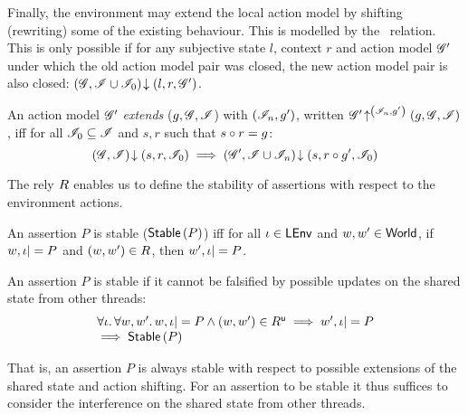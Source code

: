 Finally, the environment may extend the local action model by shifting (rewriting) some of the existing behaviour. This is modelled by the \shiftR\ relation. This is only possible if for any subjective state $l$, context $r$ and action model $\mathscr{G}'$ under which the old action model pair was closed, the new action model pair is also closed: $\left(\mathscr{G}, \mathscr{I} \cup \mathscr{I}_0\right) \!\downarrow \left(l, r, \mathscr{G}'\right)$. 
%
%
\begin{definition}\label{def:amodExtension}
An action model $\mathscr{G}'$ \emph{extends}  ($g, \mathscr{G}, \mathscr{I}$) with $(\mathscr{I}_n, g')$, written $\mathscr{G}' \!\uparrow^{\left(\mathscr{I}_n, g'\right)} \left(g, \mathscr{G}, \mathscr{I}\right)$, iff for all $\mathscr{I}_0 \subseteq \mathscr{I}$ and $s, r$ such that $s \circ r = g$:
%
\[
	\left(\mathscr{G}, \mathscr{I}\right) \!\downarrow \left(s, r, \mathscr{I}_0\right) \implies \left(\mathscr{G}', \mathscr{I} \cup \mathscr{I}_n\right) \!\downarrow \left(s, r\circ g', \mathscr{I}_0\right)
\]
%
\end{definition}
%
%
The rely $R$ enables us to define the stability of assertions with respect to the environment actions.
%
\begin{definition}[Stability] An assertion $P$ is stable ($\textsf{Stable}\left(P\right)$) iff for all $\iota \in \textsf{LEnv}$ and $w, w' \in \textsf{World}$, if $w, \iota |= P$ and $(w, w') \in R$, then $w', \iota |= P$.
\end{definition}
%
\begin{lemma}[Stability]
An assertion $P$ is stable if it cannot be falsified by possible updates on the shared state from other threads:
%
\[
\begin{array}{l}
	\forall \iota.\,\forall w, w'.\, 
    w, \iota |= P \land (w, w') \in R^{\textsf{u}} \implies
	 	w', \iota |= P\\
	 
	 \implies \textsf{Stable}\left(P\right)
\end{array}	 
\]
%
\end{lemma}
%
That is, an assertion $P$ is always stable with respect to possible extensions of the shared state and action shifting. For an assertion to be stable it thus suffices to consider the interference on the shared state from other threads.

